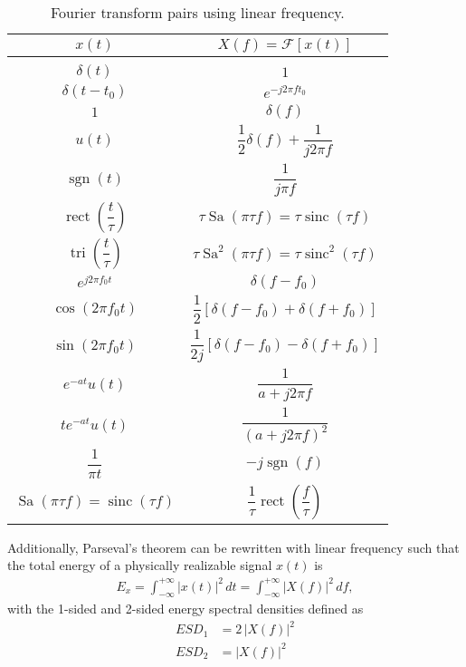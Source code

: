 \documentclass{report}
\begin{document}
\begin{table}[!hbt]
    \centering
    \caption{Fourier transform pairs using linear frequency.}
    \label{linear_fourier_pairs}
    \begin{tabular}{|c|c|}
        \hline
        $x(t)$ & $X(f)=\mathcal{F}[x(t)]$ \\[0.15cm]
        \hline
        & \\[0.1cm]
        $\delta(t)$ & $1$ \\[0.5cm]
        $\delta(t-t_0)$ & $e^{-j2\pi ft_0}$ \\[0.5cm]
        $1$ & $\delta(f)$ \\[0.5cm]
        $u(t)$ & $\dfrac{1}{2}\delta(f) + \dfrac{1}{j2\pi f}$ \\[0.5cm]
        $\operatorname{sgn}(t)$ & $\dfrac{1}{j\pi f}$ \\[0.5cm]
        $\operatorname{rect}\left(\dfrac{t}{\tau}\right)$ & $\tau\operatorname{Sa}(\pi\tau f) = \tau\operatorname{sinc}(\tau f)$ \\[0.5cm]
        $\operatorname{tri}\left(\dfrac{t}{\tau}\right)$ & $\tau\operatorname{Sa}^2(\pi\tau f) = \tau\operatorname{sinc}^2(\tau f)$ \\[0.5cm]
        $e^{j2\pi f_0 t}$ & $\delta(f-f_0)$ \\[0.5cm]
        $\cos(2\pi f_0 t)$ & $\dfrac{1}{2}[\delta(f-f_0) + \delta(f+f_0)]$ \\[0.5cm]
        $\sin(2\pi f_0 t)$ & $\dfrac{1}{2j}[\delta(f-f_0) - \delta(f+f_0)]$ \\[0.5cm]
        $e^{-at}u(t)$ & $\dfrac{1}{a+j2\pi f}$ \\[0.5cm]
        $te^{-at}u(t)$ & $\dfrac{1}{(a+j2\pi f)^2}$ \\[0.5cm]
        $\dfrac{1}{\pi t}$ & $-j \operatorname{sgn}(f)$ \\[0.5cm]
        $\operatorname{Sa}(\pi\tau f) = \operatorname{sinc}(\tau f)$ & $\dfrac{1}{\tau}\operatorname{rect}\left(\dfrac{f}{\tau}\right)$ \\[0.5cm]
        \hline
    \end{tabular}
\end{table}
\newpage
\noindent Additionally, Parseval's theorem can be rewritten with linear frequency such that the total energy of a physically realizable signal $x(t)$ is 
\begin{align}
    E_x = \int_{-\infty}^{+\infty} |x(t)|^2 \,dt = \int_{-\infty}^{+\infty} |X(f)|^2 \,df,
\end{align}
with the 1-sided and 2-sided energy spectral densities defined as 
\begin{align*}
    ESD_1 &= 2\,|X(f)|^2 \\
    ESD_2 &= |X(f)|^2
\end{align*} 
\end{document}
